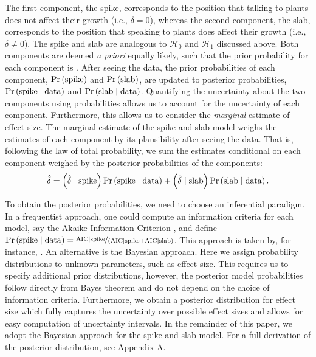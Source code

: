 \documentclass[a4paper]{article}
\newcommand{\DON}[1]{\todo[inline, color=white]{Don: #1}}
\newcommand{\hypo}[1]{\ensuremath{\mathcal{H}_{#1}}}
\newcommand{\shypo}[1]{%
	\ifnum#1>0%
		\mathrm{slab}
	\else%
		\mathrm{spike}
	\fi%
}
\newcommand{\data}{\mathrm{data}}%
\newcommand{\obsDelta}{\hat{\delta}}
\newcommand{\probo}{\mathrm{Pr}}
\newcommand{\prob}[1]{\probo\left(#1\right)}
\newcommand{\AIC}{\mathrm{AIC}}
\newenvironment{revision}{\color{teal}}{\color{black}}
\begin{document}
The first component\begin{revision}, the spike, \end{revision}corresponds to the position that talking to plants does not affect their growth (i.e., $\delta = 0$), whereas the second component\begin{revision}, the slab, \end{revision}corresponds to the position that speaking to plants does affect their growth (i.e., $\delta \neq 0$).
\begin{revision}%
\begin{revision}The spike and slab\end{revision} are analogous to \hypo{0} and \hypo{1} discussed above.
\end{revision}%
Both components are deemed \emph{a priori} equally likely, such that the prior probability for each component is .
\begin{revision}%
After seeing the data, the prior probabilities of each component, $\prob{\shypo{0}}$ and $\prob{\shypo{1}}$, are updated to posterior probabilities, $\prob{\shypo{0}\mid\data}$ and $\prob{\shypo{1}\mid\data}$.
Quantifying the uncertainty about the two components using probabilities allows us to account for the uncertainty of each component.
Furthermore, this allows us to consider the \emph{marginal} estimate of effect size.
The marginal estimate of the spike-and-slab model weighs the estimates of each component by its plausibility after seeing the data.
That is, following the law of total probability, we sum the estimates conditional on each component weighed by the posterior probabilities of the components:
\begin{align*}
	\obsDelta = \left(\obsDelta\mid\shypo{0}\right)\prob{\shypo{0}\mid\data} + \left(\obsDelta\mid\shypo{1}\right)\prob{\shypo{1}\mid\data}.
\end{align*}

To obtain the posterior probabilities, we need to choose an inferential paradigm.
In a frequentist approach, one could compute an information criteria for each model, say the Akaike Information Criterion \parencite[AIC;][]{Akaike1973}, and define $\prob{\shypo{0}\mid\data} = \nicefrac{\AIC\mid\shypo{0}}{\left(\AIC\mid\shypo{0} + \AIC\mid\shypo{1}\right)}$.
This approach is taken by, for instance, \textcite{BurnhamAnderson2002}.
An alternative is the Bayesian approach.
Here we assign probability distributions to unknown parameters, such as effect size.
This requires us to specify additional prior distributions, however, the posterior model probabilities follow directly from Bayes theorem and do not depend on the choice of information criteria.
Furthermore, we obtain a posterior distribution for effect size which fully captures the uncertainty over possible effect sizes and allows for easy computation of uncertainty intervals.
In the remainder of this paper, we adopt the Bayesian approach for the spike-and-slab model.
For a full derivation of the posterior distribution, see Appendix A.
\DON{TODO: Actually write this appendix/ box.}
\end{revision}
\end{document}
